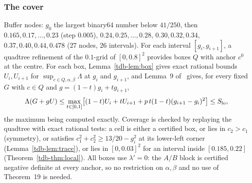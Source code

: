 \subsubsection{The cover}
Buffer nodes: $g_0$ the largest binary64 number below $41/250$, then $0.165,0.17,\dots,0.23$ (step $0.005$), $0.24,0.25,\dots,0.28$, $0.30,0.32,0.34$,
$0.37,0.40,0.44,0.478$ (27 nodes, 26 intervals). For each interval $[g_i,g_{i+1}]$, a quadtree refinement of the $0.1$-grid of $[0,0.8]^2$
provides boxes $Q$ with anchor $c^0$ at the centre. For each box, Lemma~\ref{tdb-lem:box} gives exact rational bounds $U_i,U_{i+1}$ for
$\sup_{c\in Q,\alpha,\beta}\Lambda$ at $g_i$ and $g_{i+1}$, and Lemma~9 of \Sd\ gives, for every fixed $G$ with $c\in Q$ and
$g=(1-t)g_i+tg_{i+1}$,
\[
\Lambda(G+gU)\le\max_{t\in[0,1]}\bigl[(1-t)U_i+tU_{i+1}+p\,t(1-t)(g_{i+1}-g_i)^2\bigr]\le S_{\rm lo},
\]
the maximum being computed exactly. Coverage is checked by replaying the quadtree with exact rational tests: a cell is either a certified
box, or lies in $c_2>c_1$ (symmetry), or satisfies $c_{1}^2+c_{2}^2\ge13/20-g_i^2$ at its lower-left corner (Lemma~\ref{tdb-lem:trace}), or lies in
$[0,0.03]^2$ for an interval inside $[0.185,0.22]$ (Theorem~\ref{tdb-thm:local}). All boxes use $\lambda'=0$: the $A/B$ block is certified negative
definite at every anchor, so no restriction on $\alpha,\beta$ and no use of Theorem~19 is needed.


